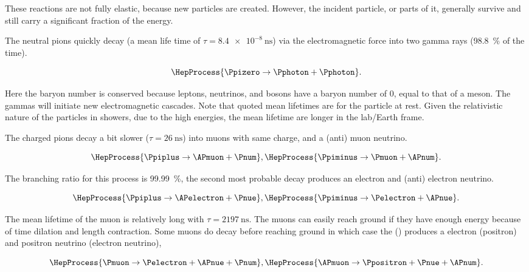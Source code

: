 These reactions are not fully elastic, because new particles are created. However, the incident particle, or parts of it, generally survive and still carry a significant fraction of the energy.

The neutral pions quickly decay (a mean life time of $\tau = \SI{8.4e-8}{\ns}$) via the electromagnetic force into two gamma rays (\SI{98.8}{\percent} of the time).

\begin{equation}
\HepProcess{\Ppizero \to \Pphoton + \Pphoton}.
\end{equation}

Here the baryon number is conserved because leptons, neutrinos, and bosons have a baryon number of 0, equal to that of a meson. The gammas will initiate new electromagnetic cascades. Note that quoted mean lifetimes are for the particle at rest. Given the relativistic nature of the particles in showers, due to the high energies, the mean lifetime are longer in the lab/Earth frame.

The charged pions decay a bit slower ($\tau = \SI{26}{\ns}$) into muons with same charge, and a (anti) muon neutrino.

\begin{equation}
\HepProcess{\Ppiplus \to \APmuon + \Pnum},
\HepProcess{\Ppiminus \to \Pmuon + \APnum}.
\end{equation}

The branching ratio for this process is \SI{99.99}{\percent}, the second most probable decay produces an electron and (anti) electron neutrino.

\begin{equation}
\HepProcess{\Ppiplus \to \APelectron + \Pnue},
\HepProcess{\Ppiminus \to \Pelectron + \APnue}.
\end{equation}

The mean lifetime of the muon is relatively long with $\tau = \SI{2197}{\ns}$. The muons can easily reach ground if they have enough energy because of time dilation and length contraction. Some muons do decay before reaching ground in which case the \Pmuon (\APmuon) produces a electron (positron) and positron neutrino (electron neutrino),

\begin{equation}
\HepProcess{\Pmuon \to \Pelectron + \APnue + \Pnum}, \\
\HepProcess{\APmuon \to \Ppositron + \Pnue + \APnum}.
\end{equation}

